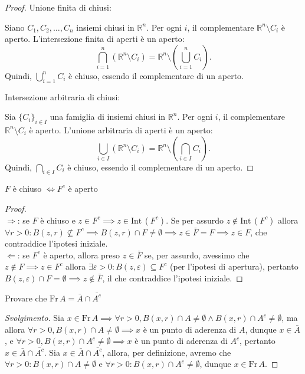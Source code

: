 %
\begin{proof}
	Unione finita di chiusi:
		
	Siano $C_1, C_2, \dots, C_n$ insiemi chiusi in $\mathbb{R}^n$. Per ogni $i$, il complementare $\mathbb{R}^n \setminus C_i$ è aperto. L’intersezione finita di aperti è un aperto:
	\[
	\bigcap_{i=1}^n (\mathbb{R}^n \setminus C_i) = \mathbb{R}^n \setminus \left( \bigcup_{i=1}^n C_i \right).
	\]
	Quindi, $\bigcup_{i=1}^n C_i$ è chiuso, essendo il complementare di un aperto.
		
	Intersezione arbitraria di chiusi:
		
	Sia $\{C_i\}_{i \in I}$ una famiglia di insiemi chiusi in $\mathbb{R}^n$. Per ogni $i$, il complementare $\mathbb{R}^n \setminus C_i$ è aperto. L’unione arbitraria di aperti è un aperto:
	\[
	\bigcup_{i \in I} (\mathbb{R}^n \setminus C_i) = \mathbb{R}^n \setminus \left( \bigcap_{i \in I} C_i \right).
	\]
	Quindi, $\bigcap_{i \in I} C_i$ è chiuso, essendo il complementare di un aperto.
\end{proof}
%
\vspace{0.5cm}
\begin{prop}
	$F$ è chiuso $\iff F^c$ è aperto
	\label{prop:set_closed_iff_compl_open}
\end{prop}
%
\begin{proof} \hspace{1cm} \\
	$\boxed{\Rightarrow}$: se $F$ è chiuso e $z \in F^c \implies z \in \text{Int} \, (F^c)$. Se per assurdo $z \not\in \text{Int} \, (F^c)$ allora $\forall r > 0: B(z, r) \not\subseteq F^c \implies B(z, r) \cap F \neq \emptyset \implies z \in \bar{F} = F \implies z \in F$, che contraddice l'ipotesi iniziale. \\
	$\boxed{\Leftarrow}$: se $F^c$ è aperto, allora preso $z \in \bar{F}$ se, per assurdo, avessimo che $z \not\in F \implies z \in F^c$ allora $\exists \varepsilon > 0: B(z, \varepsilon) \subseteq F^c$ (per l'ipotesi di apertura), pertanto $B(z, \varepsilon) \cap F = \emptyset \implies z \not\in \bar{F}$, il che contraddice l'ipotesi iniziale. 
\end{proof}
%
\vspace{0.5cm}
\begin{exercise}
	Provare che $\text{Fr} \, A = \bar{A} \cap \bar{A^c}$
	\label{exercise:frontiera_intersec}
\end{exercise}
%
\begin{proof}[Svolgimento]
	Sia $x \in \text{Fr} \, A \implies \forall r > 0, B(x, r) \cap A \neq \emptyset \wedge B(x, r) \cap A^c \neq \emptyset$, ma allora $\forall r > 0, B(x, r) \cap A \neq \emptyset \implies x$ è un punto di aderenza di $A$, dunque $x \in \bar{A}$, e $\forall r > 0, B(x, r) \cap A^c \neq \emptyset \implies x$ è un punto
	di aderenza di $A^c$, pertanto $x \in \bar{A} \cap \bar{A^c}$. Sia $x \in \bar{A} \cap \bar{A^c}$, allora, per definizione, avremo che $\forall r > 0: B(x, r) \cap A \neq \emptyset$ e $\forall r > 0: B(x, r) \cap A^c \neq \emptyset$, dunque $x \in \text{Fr} \, A$.
\end{proof}
